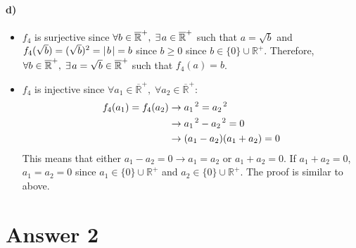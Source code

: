 \documentclass[12pt]{article}
\newcommand\+{\mkern2mu}
\begin{document}
\paragraph{d)}
\begin{itemize}
\item $f_4$ is surjective since $\forall b \in \overline{\mathbb{R}}^+, \; \exists \+ a \in \overline{\mathbb{R}}^+$ such that $a = \sqrt{b}$ and $f_4(\sqrt{b}) = (\sqrt{b})^2 = \vert \+ b \+ \vert = b$ since $b \geq 0$ since $b \in \{0\} \cup \mathbb{R}^+$.
Therefore, $\forall b \in \overline{\mathbb{R}}^+, \; \exists \+ a = \sqrt{b} \in \overline{\mathbb{R}}^+$ such that $f_4(a) = b$.
\item $f_4$ is injective since $\forall a_1 \in \overline{\mathbb{R}}^+, \; \forall a_2 \in \overline{\mathbb{R}}^+$:
\begin{align*}
f_4(a_1) = f_4(a_2) &\rightarrow a_1 \+ ^2 = a_2 \+ ^2 \\
&\rightarrow a_1 \+ ^2 - a_2 \+ ^2 = 0 \\
&\rightarrow (a_1 - a_2)(a_1 + a_2) = 0
\end{align*}
This means that either $a_1 - a_2 = 0 \rightarrow a_1 = a_2$ or $a_1 + a_2 = 0$.
If $a_1 + a_2 = 0$, $a_1 = a_2 = 0$ since $a_1 \in \{0\} \cup \mathbb{R}^+$ and $a_2 \in \{0\} \cup \mathbb{R}^+$.
The proof is similar to above.
\end{itemize}

\section*{Answer 2}
\end{document}
